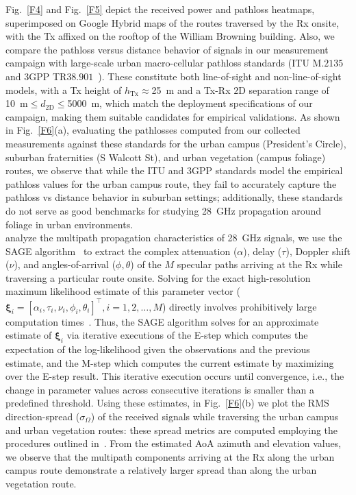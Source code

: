 \documentclass[10pt, twocolumn]{IEEEtran}
\begin{document}
Fig.~\ref{F4} and Fig.~\ref{F5} depict the received power and pathloss heatmaps, superimposed on Google Hybrid maps of the routes traversed by the Rx onsite, with the Tx affixed on the rooftop of the William Browning building. Also, we compare the pathloss versus distance behavior of signals in our measurement campaign with large-scale urban macro-cellular pathloss standards (ITU M$.2135$ and $3$GPP TR$38.901$~\cite{MacCartneyModelsOverview}). These constitute both line-of-sight and non-line-of-sight models, with a Tx height of $h_{\text{Tx}}{\approx}$\SI{25}{\meter} and a Tx-Rx $2$D separation range of \SI{10}{\meter}${\leq}d_{2\text{D}}{\leq}$\SI{5000}{\meter}, which match the deployment specifications of our campaign, making them suitable candidates for empirical validations. As shown in Fig.~\ref{F6}(a), evaluating the pathlosses computed from our collected measurements against these standards for the urban campus (President's Circle), suburban fraternities (S Walcott St), and urban vegetation (campus foliage) routes, we observe that while the ITU and $3$GPP standards model the empirical pathloss values for the urban campus route, they fail to accurately capture the pathloss vs distance behavior in suburban settings; additionally, these standards do not serve as good benchmarks for studying \SI{28}{\giga\hertz} propagation around foliage in urban environments.\\
 analyze the multipath propagation characteristics of \SI{28}{\giga\hertz} signals, we use the SAGE algorithm~\cite{SAGE} to extract the complex attenuation ($\alpha$), delay ($\tau$), Doppler shift ($\nu$), and angles-of-arrival ($\phi,\theta$) of the $M$ specular paths arriving at the Rx while traversing a particular route onsite. Solving for the exact high-resolution maximum likelihood estimate of this parameter vector ($\bm{\xi}_{i}{=}[\alpha_{i},\tau_{i},\nu_{i},\phi_{i},\theta_{i}]^{\intercal},i{=}1,2,{\dots},M$) directly involves prohibitively large computation times~\cite{SAGE}. Thus, the SAGE algorithm solves for an approximate estimate of $\bm{\xi}_{i}$ via iterative executions of the E-step which computes the expectation of the log-likelihood given the observations and the previous estimate, and the M-step which computes the current estimate by maximizing over the E-step result. This iterative execution occurs until convergence, i.e., the change in parameter values across consecutive iterations is smaller than a predefined threshold. Using these estimates, in Fig.~\ref{F6}(b) we plot the RMS direction-spread ($\sigma_{\Omega}$) of the received signals while traversing the urban campus and urban vegetation routes: these spread metrics are computed employing the procedures outlined in~\cite{Indoor60G}. From the estimated AoA azimuth and elevation values, we observe that the multipath components arriving at the Rx along the urban campus route demonstrate a relatively larger spread than along the urban vegetation route.\\
\end{document}
